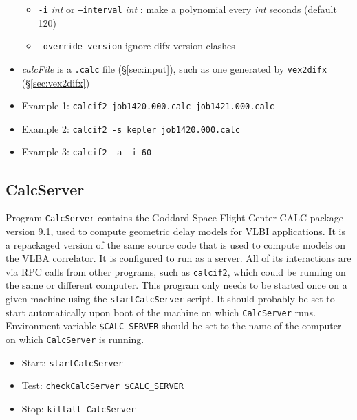 \begin{itemize}
\begin{itemize}
\item[] {\tt -i} {\em int} or {\tt --interval} {\em int} : make a polynomial every {\em int} seconds (default 120)
\item[] {\tt --override-version} ignore difx version clashes
\end{itemize}
\item[] {\em calcFile} is a {\tt .calc} file (\S\ref{sec:input}), such as one generated by {\tt vex2difx} (\S\ref{sec:vex2difx})
\item[] Example 1: {\tt calcif2 job1420.000.calc job1421.000.calc} 
\item[] Example 2: {\tt calcif2 -s kepler job1420.000.calc}
\item[] Example 3: {\tt calcif2 -a -i 60} 
\end{itemize}








\subsection{CalcServer} \label{sec:CalcServer}

Program {\tt CalcServer} contains the Goddard Space Flight Center CALC package version 9.1, used to compute geometric delay models for VLBI applications.
It is a repackaged version of the same source code that is used to compute models on the VLBA correlator.
It is configured to run as a server.
All of its interactions are via RPC calls from other programs, such as {\tt calcif2}, which could be running on the same or different computer.
\newcommand{\oa}[1]{\hspace{-12pt}\makebox[12pt]{$\star$}#1}
This program only needs to be started once on a given machine using the {\tt startCalcServer} script.
It should probably be set to start automatically upon boot of the machine on which {\tt CalcServer} runs.
Environment variable {\tt \$CALC\_SERVER} should be set to the name of the computer on which {\tt CalcServer} is running.

\begin{itemize}
\item[] Start: {\tt startCalcServer}
\item[] Test: {\tt checkCalcServer \$CALC\_SERVER}
\item[] Stop: {\tt killall CalcServer}
\end{itemize}

